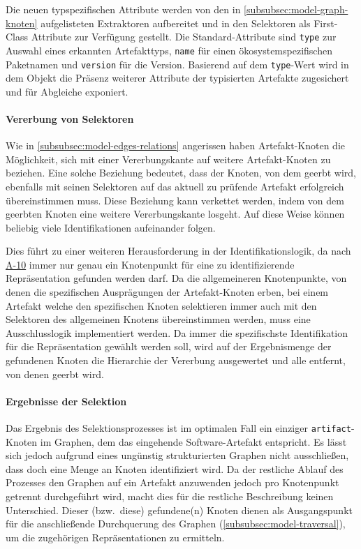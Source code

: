 Die neuen typspezifischen Attribute werden von den in \autoref{subsubsec:model-graph-knoten} aufgelisteten Extraktoren aufbereitet und in den Selektoren als First-Class Attribute zur Verfügung gestellt.
Die Standard-Attribute sind \texttt{type} zur Auswahl eines erkannten Artefakttyps, \texttt{name} für einen ökosystemspezifischen Paketnamen und \texttt{version} für die Version.
Basierend auf dem \texttt{type}-Wert wird in dem Objekt die Präsenz weiterer Attribute der typisierten Artefakte zugesichert und für Abgleiche exponiert.

\paragraph{Vererbung von Selektoren}

Wie in \autoref{subsubsec:model-edges-relations} angerissen haben Artefakt-Knoten die Möglichkeit, sich mit einer Vererbungskante auf weitere Artefakt-Knoten zu beziehen.
Eine solche Beziehung bedeutet, dass der Knoten, von dem geerbt wird, ebenfalls mit seinen Selektoren auf das aktuell zu prüfende Artefakt erfolgreich übereinstimmen muss.
Diese Beziehung kann verkettet werden, indem von dem geerbten Knoten eine weitere Vererbungskante losgeht.
Auf diese Weise können beliebig viele Identifikationen aufeinander folgen.

Dies führt zu einer weiteren Herausforderung in der Identifikationslogik, da nach \hyperref[subsec:req-graph-inner-consistency]{A-10} immer nur genau ein Knotenpunkt für eine zu identifizierende Repräsentation gefunden werden darf.
Da die allgemeineren Knotenpunkte, von denen die spezifischen Ausprägungen der Artefakt-Knoten erben, bei einem Artefakt welche den spezifischen Knoten selektieren immer auch mit den Selektoren des allgemeinen Knotens übereinstimmen werden, muss eine Ausschlusslogik implementiert werden.
Da immer die spezifischste Identifikation für die Repräsentation gewählt werden soll, wird auf der Ergebnismenge der gefundenen Knoten die Hierarchie der Vererbung ausgewertet und alle entfernt, von denen geerbt wird.

\paragraph{Ergebnisse der Selektion}

Das Ergebnis des Selektionsprozesses ist im optimalen Fall ein einziger \texttt{artifact}-Knoten im Graphen, dem das eingehende Software-Artefakt entspricht.
Es lässt sich jedoch aufgrund eines ungünstig strukturierten Graphen nicht ausschließen, dass doch eine Menge an Knoten identifiziert wird.
Da der restliche Ablauf des Prozesses den Graphen auf ein Artefakt anzuwenden jedoch pro Knotenpunkt getrennt durchgeführt wird, macht dies für die restliche Beschreibung keinen Unterschied.
Dieser (bzw.\ diese) gefundene(n) Knoten dienen als Ausgangspunkt für die anschließende Durchquerung des Graphen (\autoref{subsubsec:model-traversal}), um die zugehörigen Repräsentationen zu ermitteln.

